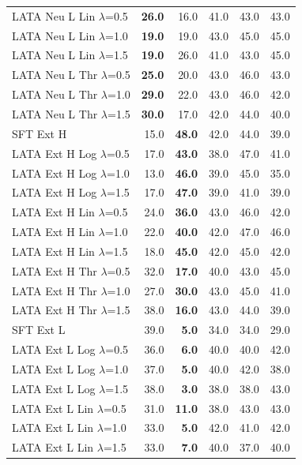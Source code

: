 \begin{longtable}{lrrrrr}
LATA Neu L Lin $\lambda$=0.5 & \textbf{26.0} & 16.0 & 41.0 & 43.0 & 43.0 \\
LATA Neu L Lin $\lambda$=1.0 & \textbf{19.0} & 19.0 & 43.0 & 45.0 & 45.0 \\
LATA Neu L Lin $\lambda$=1.5 & \textbf{19.0} & 26.0 & 41.0 & 43.0 & 45.0 \\
LATA Neu L Thr $\lambda$=0.5 & \textbf{25.0} & 20.0 & 43.0 & 46.0 & 43.0 \\
LATA Neu L Thr $\lambda$=1.0 & \textbf{29.0} & 22.0 & 43.0 & 46.0 & 42.0 \\
LATA Neu L Thr $\lambda$=1.5 & \textbf{30.0} & 17.0 & 42.0 & 44.0 & 40.0 \\
SFT Ext H & 15.0 & \textbf{48.0} & 42.0 & 44.0 & 39.0 \\
LATA Ext H Log $\lambda$=0.5 & 17.0 & \textbf{43.0} & 38.0 & 47.0 & 41.0 \\
LATA Ext H Log $\lambda$=1.0 & 13.0 & \textbf{46.0} & 39.0 & 45.0 & 35.0 \\
LATA Ext H Log $\lambda$=1.5 & 17.0 & \textbf{47.0} & 39.0 & 41.0 & 39.0 \\
LATA Ext H Lin $\lambda$=0.5 & 24.0 & \textbf{36.0} & 43.0 & 46.0 & 42.0 \\
LATA Ext H Lin $\lambda$=1.0 & 22.0 & \textbf{40.0} & 42.0 & 47.0 & 46.0 \\
LATA Ext H Lin $\lambda$=1.5 & 18.0 & \textbf{45.0} & 42.0 & 45.0 & 42.0 \\
LATA Ext H Thr $\lambda$=0.5 & 32.0 & \textbf{17.0} & 40.0 & 43.0 & 45.0 \\
LATA Ext H Thr $\lambda$=1.0 & 27.0 & \textbf{30.0} & 43.0 & 45.0 & 41.0 \\
LATA Ext H Thr $\lambda$=1.5 & 38.0 & \textbf{16.0} & 43.0 & 44.0 & 39.0 \\
SFT Ext L & 39.0 & \textbf{5.0} & 34.0 & 34.0 & 29.0 \\
LATA Ext L Log $\lambda$=0.5 & 36.0 & \textbf{6.0} & 40.0 & 40.0 & 42.0 \\
LATA Ext L Log $\lambda$=1.0 & 37.0 & \textbf{5.0} & 40.0 & 42.0 & 38.0 \\
LATA Ext L Log $\lambda$=1.5 & 38.0 & \textbf{3.0} & 38.0 & 38.0 & 43.0 \\
LATA Ext L Lin $\lambda$=0.5 & 31.0 & \textbf{11.0} & 38.0 & 43.0 & 43.0 \\
LATA Ext L Lin $\lambda$=1.0 & 33.0 & \textbf{5.0} & 42.0 & 41.0 & 42.0 \\
LATA Ext L Lin $\lambda$=1.5 & 33.0 & \textbf{7.0} & 40.0 & 37.0 & 40.0 \\

\end{longtable}
